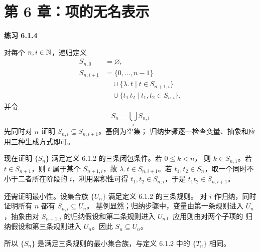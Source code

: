\section*{第 6 章：项的无名表示}

\begin{taplsolutionentrybox}
\label{sol:translator:6.1.4}
\textbf{练习 6.1.4}

对每个 \(n,i\in\mathbb{N}\)，递归定义
\[
\begin{aligned}
S_{n,0}&=\varnothing,\\
S_{n,i+1}
  &=
  \{0,\ldots,n-1\}\\
  &\quad{}\cup
  \{\lambda.\,t\mid t\in S_{n+1,i}\}\\
  &\quad{}\cup
  \{t_1\,t_2\mid t_1,t_2\in S_{n,i}\},
\end{aligned}
\]
并令
\[
  S_n=\bigcup_iS_{n,i}
\]
先同时对 \(n\) 证明 \(S_{n,i}\subseteq S_{n,i+1}\)。基例为空集；
归纳步骤逐一检查变量、抽象和应用三种生成方式即可。

现在证明 \(\{S_n\}\) 满足定义 6.1.2 的三条闭包条件。若 \(0\leq k<n\)，
则 \(k\in S_{n,1}\)。若 \(t\in S_{n+1}\)，则 \(t\) 属于某个
\(S_{n+1,i}\)，故 \(\lambda.\,t\in S_{n,i+1}\)。若
\(t_1,t_2\in S_n\)，取一个同时不小于二者所在阶段的 \(i\)，利用累积性可得
\(t_1,t_2\in S_{n,i}\)，于是 \(t_1t_2\in S_{n,i+1}\)。

还需证明最小性。设集合族 \(\{U_n\}\) 满足定义 6.1.2 的三条规则。
对 \(i\) 作归纳，同时证明所有 \(n\) 都有 \(S_{n,i}\subseteq U_n\)。
基例显然；归纳步骤中，变量由第一条规则进入 \(U_n\)，抽象由对
\(S_{n+1,i}\) 的归纳假设和第二条规则进入 \(U_n\)，应用则由对两个子项的
归纳假设和第三条规则进入 \(U_n\)。因此 \(S_n\subseteq U_n\)。

所以 \(\{S_n\}\) 是满足三条规则的最小集合族，与定义 6.1.2 中的
\(\{T_n\}\) 相同。

\end{taplsolutionentrybox}

